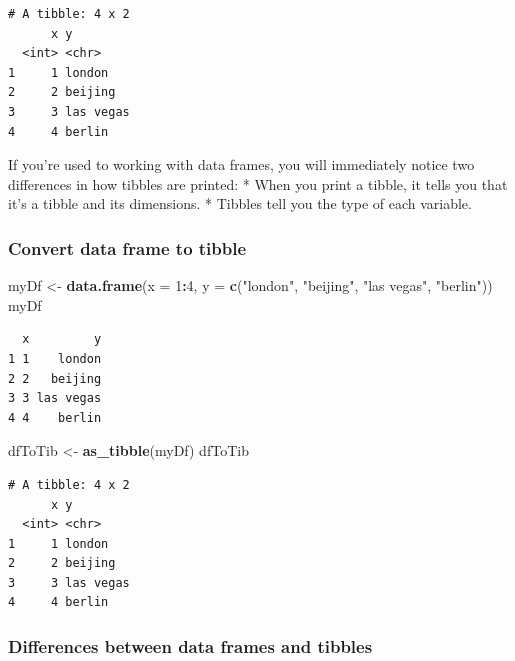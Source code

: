 \documentclass[
]{article}
\newenvironment{Shaded}{\begin{snugshade}}{\end{snugshade}}
\newcommand{\AttributeTok}[1]{\textcolor[rgb]{0.13,0.29,0.53}{#1}}
\newcommand{\DecValTok}[1]{\textcolor[rgb]{0.00,0.00,0.81}{#1}}
\newcommand{\FunctionTok}[1]{\textcolor[rgb]{0.13,0.29,0.53}{\textbf{#1}}}
\newcommand{\NormalTok}[1]{#1}
\newcommand{\OtherTok}[1]{\textcolor[rgb]{0.56,0.35,0.01}{#1}}
\newcommand{\SpecialCharTok}[1]{\textcolor[rgb]{0.81,0.36,0.00}{\textbf{#1}}}
\newcommand{\StringTok}[1]{\textcolor[rgb]{0.31,0.60,0.02}{#1}}
\begin{document}
\begin{verbatim}
# A tibble: 4 x 2
      x y        
  <int> <chr>    
1     1 london   
2     2 beijing  
3     3 las vegas
4     4 berlin   
\end{verbatim}

If you're used to working with data frames, you will immediately notice
two differences in how tibbles are printed: * When you print a tibble,
it tells you that it's a tibble and its dimensions. * Tibbles tell you
the type of each variable.

\subsubsection{Convert data frame to
tibble}\label{convert-data-frame-to-tibble}

\begin{Shaded}
\begin{Highlighting}[]
\NormalTok{myDf }\OtherTok{\textless{}{-}} \FunctionTok{data.frame}\NormalTok{(}\AttributeTok{x =} \DecValTok{1}\SpecialCharTok{:}\DecValTok{4}\NormalTok{,}
                   \AttributeTok{y =} \FunctionTok{c}\NormalTok{(}\StringTok{"london"}\NormalTok{, }\StringTok{"beijing"}\NormalTok{, }\StringTok{"las vegas"}\NormalTok{, }\StringTok{"berlin"}\NormalTok{))}
\NormalTok{myDf}
\end{Highlighting}
\end{Shaded}

\begin{verbatim}
  x         y
1 1    london
2 2   beijing
3 3 las vegas
4 4    berlin
\end{verbatim}

\begin{Shaded}
\begin{Highlighting}[]
\NormalTok{dfToTib }\OtherTok{\textless{}{-}} \FunctionTok{as\_tibble}\NormalTok{(myDf)}
\NormalTok{dfToTib}
\end{Highlighting}
\end{Shaded}

\begin{verbatim}
# A tibble: 4 x 2
      x y        
  <int> <chr>    
1     1 london   
2     2 beijing  
3     3 las vegas
4     4 berlin   
\end{verbatim}

\subsubsection{Differences between data frames and
tibbles}\label{differences-between-data-frames-and-tibbles}
\end{document}
